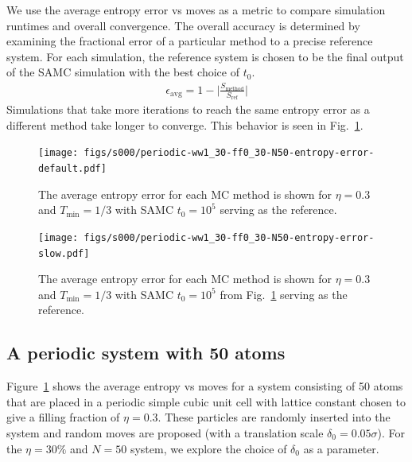 \documentclass[letterpaper,twocolumn,amsmath,amssymb,pre,aps,10pt]{revtex4-1}
\begin{document}
We use the average entropy error vs moves as a metric to compare
simulation runtimes and overall convergence. The overall accuracy
is determined by examining the fractional error of a particular method to
a precise reference system. For each simulation, the reference system
is chosen to be the final output of the SAMC simulation with the best
choice of $t_0$.
\begin{align}
\epsilon_\text{avg} = 1 - \bigg\lvert\frac{S_\text{method}}{S_\text{ref}}\bigg\rvert
\end{align}
Simulations that take more iterations to reach the same entropy error as a
different method take longer to converge. This behavior is seen in
Fig.~\ref{fig:N50-ff0.3-avg-error}.

\begin{figure}
  \texttt{[image: figs/s000/periodic-ww1\_30-ff0\_30-N50-entropy-error-default.pdf]}
  \caption{The average entropy error for each MC method is shown for $\eta = 0.3$ and $T_{\min} = 1/3$ with
  SAMC $t_0 = 10^5$ serving as the reference.}\label{fig:N50-ff0.3-avg-error}
\end{figure}
\begin{figure}
  \texttt{[image: figs/s000/periodic-ww1\_30-ff0\_30-N50-entropy-error-slow.pdf]}
  \caption{The average entropy error for each MC method is shown for $\eta = 0.3$ and $T_{\min} = 1/3$ with
  SAMC $t_0 = 10^5$ from Fig.~\ref{fig:N50-ff0.3-avg-error}
  serving as the reference.}\label{fig:N50-ff0.3-avg-error-slow}
\end{figure}

\subsection{A periodic system with 50 atoms}

Figure~\ref{fig:N50-ff0.3-avg-error} shows the average entropy vs moves
for a system consisting of 50 atoms that are placed in a periodic
simple cubic unit cell with lattice constant chosen to give a filling
fraction of $\eta = 0.3$.  These particles are randomly inserted into
the system and random moves are proposed (with a translation scale
$\delta_0 = 0.05\sigma$). For the $\eta = 30\%$ and $N = 50$ system, we
explore the choice of $\delta_0$ as a parameter.
\end{document}
